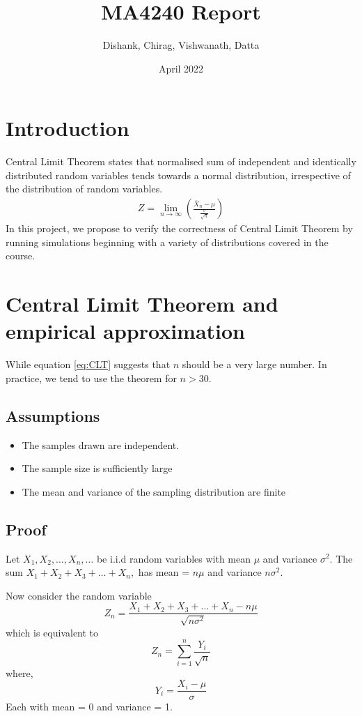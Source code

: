 \documentclass{article}
\title{MA4240 Report}
\author{Dishank, Chirag, Vishwanath, Datta}
\date{April 2022}
\begin{document}
\maketitle

\section{Introduction}
Central Limit Theorem states that normalised sum of independent and identically distributed random variables tends towards a normal distribution, irrespective of the distribution of random variables.
\begin{align}
    Z = \lim_{n \to \infty} \left(\frac{\bar{X}_n-\mu}{\frac{\sigma}{\sqrt{n}}}\right) \label{eq:CLT}
\end{align}
In this project, we propose to verify the correctness of Central Limit Theorem by running simulations beginning with a variety of distributions covered in the course.

\section{Central Limit Theorem and empirical approximation}
While equation \eqref{eq:CLT} suggests that $n$ should be a very large number. In practice, we tend to use the theorem for $n>30$. 
\subsection{Assumptions}
\begin{itemize}
\item  The samples drawn are independent.
\item  The sample size is sufficiently large
\item  The mean and variance of the sampling distribution are finite
\end{itemize}
\subsection{Proof}
Let $X_1,X_2,\dots,X_n,\dots$ be i.i.d random variables with mean $\mu$ and variance $\sigma^2$.
The sum $X_1+X_2+X_3+\dots+X_n,$ has mean = $n\mu$ and variance $n\sigma^2$.

Now consider the random variable 
\begin{equation}
    Z_n = \frac{X_1+X_2+X_3+\dots+X_n - n\mu}{\sqrt{n\sigma^2}}
\end{equation}
which is equivalent to 
\begin{equation}
    Z_n = \sum_{i=1}^n \frac{Y_i}{\sqrt{n}}
\end{equation}
where,
\begin{equation}
    Y_i = \frac{X_i-\mu}{\sigma}\label{a}
\end{equation}
Each with mean = 0 and variance = 1.
\end{document}
